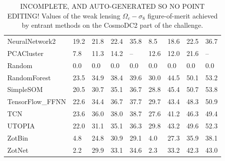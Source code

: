 \documentclass[twocolumn,twocolappendix]{aastex63}
\begin{document}
\begin{table}[]
\begin{tabular}{|l|llll|llll|}
{\sc NeuralNetwork2 } & 19.2 & 21.8    & 22.4    & 35.8    & 8.5             & 18.6             & 22.5             & 36.7\\
{\sc PCACluster } & 7.8 & 11.3    & 14.2    & --    & 12.6             & 12.0             & 21.6             & --\\
{\sc Random } & 0.0 & 0.0    & 0.0    & 0.0    & 0.0             & 0.0             & 0.0             & 0.0\\
{\sc RandomForest } & 23.5 & 34.9    & 38.4    & 39.6    & 30.0             & 44.5             & 50.1             & 53.2\\
{\sc SimpleSOM } & 20.5 & 30.7    & 35.1    & 36.7    & 28.8             & 45.4             & 50.7             & 53.8\\
{\sc TensorFlow\_FFNN } & 22.6 & 34.4    & 36.7    & 37.7    & 29.7             & 43.4             & 48.3             & 50.9\\
{\sc TCN } & 23.6 & 36.0    & 38.0    & 38.7    & 27.6             & 41.2             & 46.3             & 49.4\\
{\sc UTOPIA } & 22.0 & 31.1    & 35.1    & 36.3    & 29.8             & 43.2             & 49.6             & 52.3\\
{\sc ZotBin } & 4.8 & 24.8    & 30.9    & 29.1    & 4.0             & 27.3             & 35.9             & 38.1\\
{\sc ZotNet } & 2.2 & 29.9    & 33.1    & 34.6    & 2.3             & 33.2             & 42.3             & 43.0\\
\end{tabular}
\caption{INCOMPLETE, AND AUTO-GENERATED SO NO POINT EDITING! Values of the weak lensing $\Omega_c - \sigma_8$
figure-of-merit achieved by entrant methods on the CosmoDC2 part of the challenge.}
\label{tab:dc2_wl}
\end{table}
\end{document}
